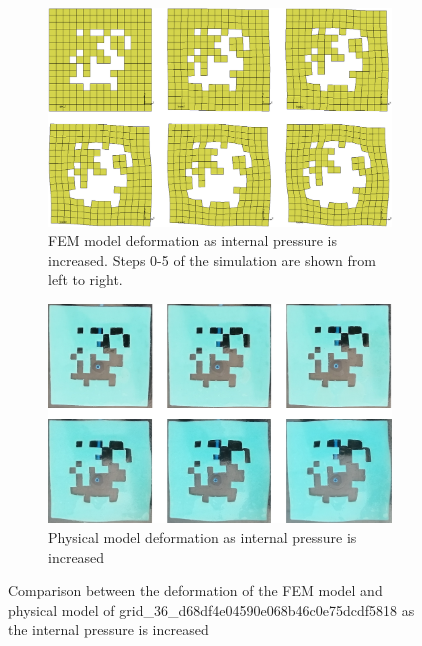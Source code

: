 \begin{figure}[H]
	\centering
	\begin{subfigure}[c]{\textwidth}
		\centering
		\includegraphics[width=\textwidth]{unit1deffem.png}
		\caption{FEM model deformation as internal pressure is increased. Steps 0-5 of the simulation are shown from left to right.}
	\end{subfigure}
	\hfill
	\begin{subfigure}[c]{\textwidth}
		\centering
		\includegraphics[width=\textwidth]{unit1defmod.png}
		\caption{Physical model deformation as internal pressure is increased}
	\end{subfigure}
	\caption[Comparison between FEM and physical models of unit 1]{Comparison between the deformation of the FEM model and physical model of grid\_36\_d68df4e04590e068b46c0e75dcdf5818 as the internal pressure is increased}
	\label{fig:unit1def}
\end{figure}

